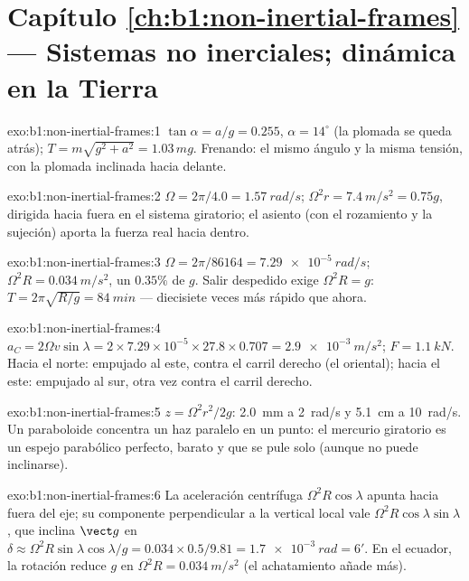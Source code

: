 \section*{Capítulo \ref{ch:b1:non-inertial-frames} --- Sistemas no inerciales; dinámica en la Tierra}

\begin{solution}{exo:b1:non-inertial-frames:1}
$\tan\alpha = a/g = 0.255$, $\alpha = 14^\circ$ (la plomada se queda
atrás); $T = m\sqrt{g^2 + a^2} = 1.03\,mg$. Frenando: el mismo ángulo y la
misma tensión, con la plomada inclinada hacia delante.
\end{solution}

\begin{solution}{exo:b1:non-inertial-frames:2}
$\Omega = 2\pi/4.0 = \qty{1.57}{rad/s}$; $\Omega^2r = \qty{7.4}{m/s^2} = 0.75g$,
dirigida hacia fuera en el sistema giratorio; el asiento (con el
rozamiento y la sujeción) aporta la fuerza real hacia dentro.
\end{solution}

\begin{solution}{exo:b1:non-inertial-frames:3}
$\Omega = 2\pi/86164 = \qty{7.29e-5}{rad/s}$; $\Omega^2R = \qty{0.034}{m/s^2}$,
un $0.35\%$ de $g$. Salir despedido exige $\Omega^2R = g$: $T = 2\pi\sqrt{R/g} =
\qty{84}{min}$ --- diecisiete veces más rápido que ahora.
\end{solution}

\begin{solution}{exo:b1:non-inertial-frames:4}
$a_C = 2\Omega v\sin\lambda = 2 \times 7.29\times10^{-5} \times 27.8 \times 0.707
= \qty{2.9e-3}{m/s^2}$; $F = \qty{1.1}{kN}$. Hacia el norte: empujado al
este, contra el carril derecho (el oriental); hacia el este: empujado al
sur, otra vez contra el carril derecho.
\end{solution}

\begin{solution}{exo:b1:non-inertial-frames:5}
$z = \Omega^2r^2/2g$: \qty{2.0}{mm} a \qty{2}{rad/s} y \qty{5.1}{cm} a
\qty{10}{rad/s}. Un paraboloide concentra un haz paralelo en un punto: el
mercurio giratorio es un espejo parabólico perfecto, barato y que se pule
solo (aunque no puede inclinarse).
\end{solution}

\begin{solution}{exo:b1:non-inertial-frames:6}
La aceleración centrífuga $\Omega^2R\cos\lambda$ apunta hacia fuera del eje;
su componente perpendicular a la vertical local vale $\Omega^2R\cos\lambda
\sin\lambda$, que inclina $\vect g$ en $\delta \approx \Omega^2R\sin\lambda\cos\lambda/g
= 0.034 \times 0.5/9.81 = \qty{1.7e-3}{rad} = 6'$. En el ecuador, la
rotación reduce $g$ en $\Omega^2R = \qty{0.034}{m/s^2}$ (el achatamiento
añade más).
\end{solution}

